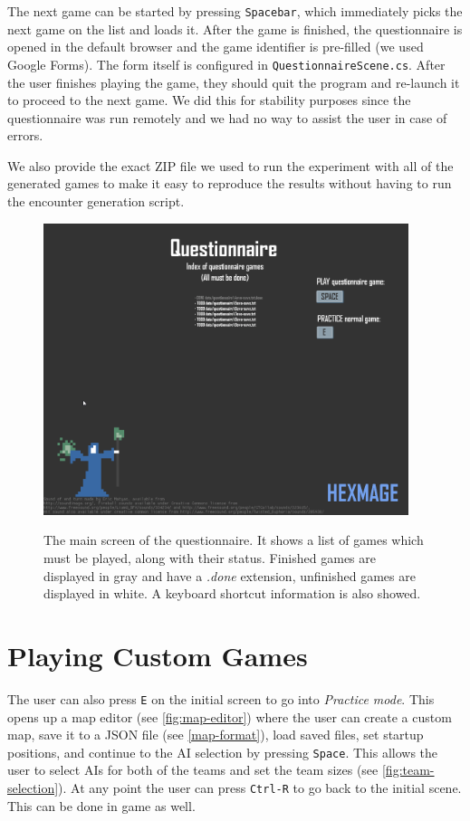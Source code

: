 The next game can be started by pressing \verb|Spacebar|, which immediately picks the next game on the list and loads it. After the game is finished, the questionnaire is opened in the default browser and the game identifier is pre-filled (we used Google Forms). The form itself is configured in \verb|QuestionnaireScene.cs|. After the user finishes playing the game, they should quit the program and re-launch it to proceed to the next game. We did this for stability purposes since the questionnaire was run remotely and we had no way to assist the user in case of errors.

We also provide the exact ZIP file we used to run the experiment with all of the generated games to make it easy to reproduce the results without having to run the encounter generation script.

\begin{figure}[h]
	\centering
	\includegraphics[width=0.95\textwidth]{img/questionnaire.png}
	\label{fig:questionnaire}
	\caption{The main screen of the questionnaire. It shows a list of games which must be played, along with their status. Finished games are displayed in gray and have a \emph{.done} extension, unfinished games are displayed in white. A keyboard shortcut information is also showed.}
\end{figure}

\section{Playing Custom Games}

The user can also press \verb|E| on the initial screen to go into \emph{Practice mode}. This opens up a map editor (see \autoref{fig:map-editor}) where the user can create a custom map, save it to a JSON file (see \autoref{map-format}), load saved files, set startup positions, and continue to the AI selection by pressing \verb|Space|. This allows the user to select AIs for both of the teams and set the team sizes (see \autoref{fig:team-selection}). At any point the user can press \verb|Ctrl-R| to go back to the initial scene. This can be done in game as well.

